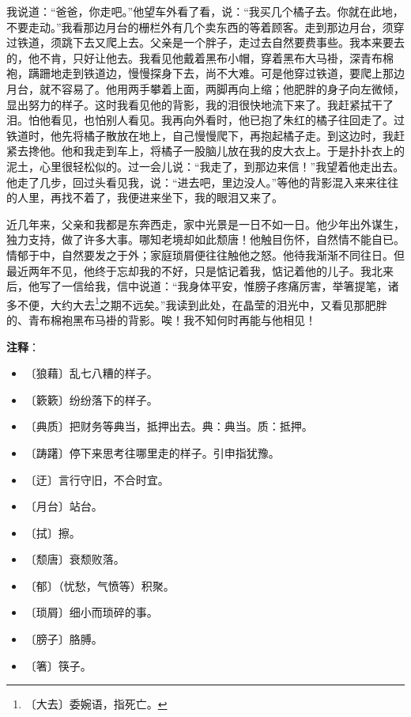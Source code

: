 \documentclass[12pt,UTF-8,openany]{ctexbook}
\begin{document}
\begin{normalsize}
    我说道：“爸爸，你走吧。”他望车外看了看，说：“我买几个橘子去。你就在此地，不要走动。”我看那边月台的栅栏外有几个卖东西的等着顾客。走到那边月台，须穿过铁道，须跳下去又爬上去。父亲是一个胖子，走过去自然要费事些。我本来要去的，他不肯，只好让他去。我看见他戴着黑布小帽，穿着黑布大马褂，深青布棉袍，蹒跚地走到铁道边，慢慢探身下去，尚不大难。可是他穿过铁道，要爬上那边月台，就不容易了。他用两手攀着上面，两脚再向上缩；他肥胖的身子向左微倾，显出努力的样子。这时我看见他的背影，我的泪很快地流下来了。我赶紧拭干了泪。怕他看见，也怕别人看见。我再向外看时，他已抱了朱红的橘子往回走了。过铁道时，他先将橘子散放在地上，自己慢慢爬下，再抱起橘子走。到这边时，我赶紧去搀他。他和我走到车上，将橘子一股脑儿放在我的皮大衣上。于是扑扑衣上的泥土，心里很轻松似的。过一会儿说：“我走了，到那边来信！”我望着他走出去。他走了几步，回过头看见我，说：“进去吧，里边没人。”等他的背影混入来来往往的人里，再找不着了，我便进来坐下，我的眼泪又来了。
    
    近几年来，父亲和我都是东奔西走，家中光景是一日不如一日。他少年出外谋生，独力支持，做了许多大事。哪知老境却如此颓唐！他触目伤怀，自然情不能自已。情郁于中，自然要发之于外；家庭琐屑便往往触他之怒。他待我渐渐不同往日。但最近两年不见，他终于忘却我的不好，只是惦记着我，惦记着他的儿子。我北来后，他写了一信给我，信中说道：“我身体平安，惟膀子疼痛厉害，举箸提笔，诸多不便，大约大去\footnote{〔大去〕委婉语，指死亡。}之期不远矣。”我读到此处，在晶莹的泪光中，又看见那肥胖的、青布棉袍黑布马褂的背影。唉！我不知何时再能与他相见！
    
\end{normalsize}


\newpage

\textbf{注释}：

\vspace{-1em}

\begin{itemize}
    \setlength\itemsep{-0.2em}
    \item 〔狼藉〕乱七八糟的样子。
    \item 〔簌簌〕纷纷落下的样子。
    \item 〔典质〕把财务等典当，抵押出去。典：典当。质：抵押。
    \item 〔踌躇〕停下来思考往哪里走的样子。引申指犹豫。
    \item 〔迂〕言行守旧，不合时宜。
    \item 〔月台〕站台。
    \item 〔拭〕擦。
    \item 〔颓唐〕衰颓败落。
    \item 〔郁〕（忧愁，气愤等）积聚。
    \item 〔琐屑〕细小而琐碎的事。
    \item 〔膀子〕胳膊。
    \item 〔箸〕筷子。
\end{itemize}
\end{document}
